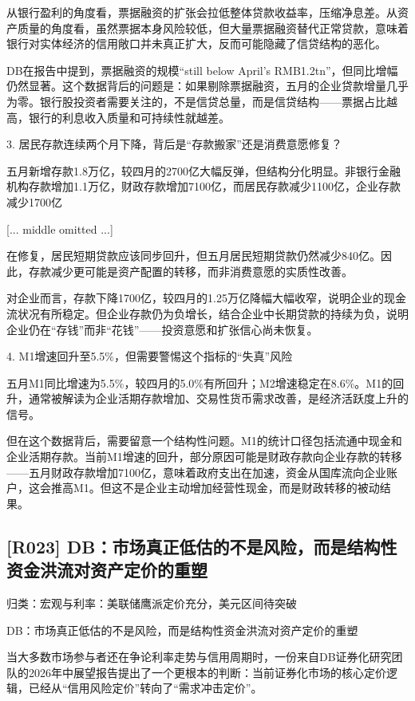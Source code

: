 \documentclass[11pt]{ctexart}
\begin{document}
从银行盈利的角度看，票据融资的扩张会拉低整体贷款收益率，压缩净息差。从资产质量的角度看，虽然票据本身风险较低，但大量票据融资替代正常贷款，意味着银行对实体经济的信用敞口并未真正扩大，反而可能隐藏了信贷结构的恶化。

DB在报告中提到，票据融资的规模“still below April’s RMB1.2tn”，但同比增幅仍然显著。这个数据背后的问题是：如果剔除票据融资，五月的企业贷款增量几乎为零。银行股投资者需要关注的，不是信贷总量，而是信贷结构——票据占比越高，银行的利息收入质量和可持续性就越差。

3. 居民存款连续两个月下降，背后是“存款搬家”还是消费意愿修复？

五月新增存款1.8万亿，较四月的2700亿大幅反弹，但结构分化明显。非银行金融机构存款增加1.1万亿，财政存款增加7100亿，而居民存款减少1100亿，企业存款减少1700亿

[... middle omitted ...]

在修复，居民短期贷款应该同步回升，但五月居民短期贷款仍然减少840亿。因此，存款减少更可能是资产配置的转移，而非消费意愿的实质性改善。

对企业而言，存款下降1700亿，较四月的1.25万亿降幅大幅收窄，说明企业的现金流状况有所稳定。但企业存款仍为负增长，结合企业中长期贷款的持续为负，说明企业仍在“存钱”而非“花钱”——投资意愿和扩张信心尚未恢复。

4. M1增速回升至5.5\%，但需要警惕这个指标的“失真”风险

五月M1同比增速为5.5\%，较四月的5.0\%有所回升；M2增速稳定在8.6\%。M1的回升，通常被解读为企业活期存款增加、交易性货币需求改善，是经济活跃度上升的信号。

但在这个数据背后，需要留意一个结构性问题。M1的统计口径包括流通中现金和企业活期存款。当前M1增速的回升，部分原因可能是财政存款向企业存款的转移——五月财政存款增加7100亿，意味着政府支出在加速，资金从国库流向企业账户，这会推高M1。但这不是企业主动增加经营性现金，而是财政转移的被动结果。

\subsection{[R023] DB：市场真正低估的不是风险，而是结构性资金洪流对资产定价的重塑}
{\small\color{refgray}归类：宏观与利率：美联储鹰派定价充分，美元区间待突破}

DB：市场真正低估的不是风险，而是结构性资金洪流对资产定价的重塑

当大多数市场参与者还在争论利率走势与信用周期时，一份来自DB证券化研究团队的2026年中展望报告提出了一个更根本的判断：当前证券化市场的核心定价逻辑，已经从“信用风险定价”转向了“需求冲击定价”。
\end{document}
